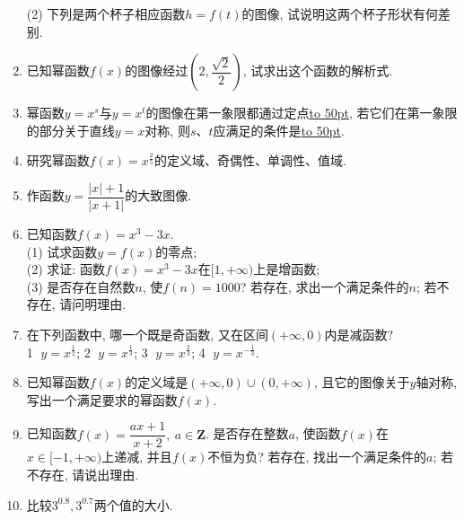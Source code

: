 \documentclass[10pt,a4paper]{article}
\newcommand{\blank}[1]{\underline{\hbox to #1pt{}}}
\begin{document}
\begin{enumerate}[1.]
\begin{center}
\end{center}
(2) 下列是两个杯子相应函数$h=f(t)$的图像, 试说明这两个杯子形状有何差别.
\begin{center}
\end{center}
\item 已知幂函数$f(x)$的图像经过$(2,\dfrac{\sqrt 2}2)$, 试求出这个函数的解析式.
\item 幂函数$y=x^s$与$y=x^t$的图像在第一象限都通过定点\blank{50}, 若它们在第一象限的部分关于直线$y=x$对称, 则$s$、$t$应满足的条件是\blank{50}.
\item 研究幂函数$f(x)=x^{\frac 25}$的定义域、奇偶性、单调性、值域.
\item 作函数$y=\dfrac{|x|+1}{|x+1|}$的大致图像.
\item 已知函数$f(x)=x^3-3x$.\\
(1) 试求函数$y=f(x)$的零点;\\
(2) 求证: 函数$f(x)=x^3-3x$在$[1,+\infty)$上是增函数;\\
(3) 是否存在自然数$n$, 使$f(n)=1000$? 若存在, 求出一个满足条件的$n$; 若不存在, 请问明理由.
\item 在下列函数中, 哪一个既是奇函数, 又在区间$(+\infty ,0)$内是减函数?\\ 
\textcircled{1} $y=x^{\frac 12}$; \textcircled{2} $y=x^{\frac 13}$; \textcircled{3} $y=x^{\frac 23}$; \textcircled{4} $y=x^{-\frac 13}$.
\item 已知幂函数$f(x)$的定义域是$(+\infty ,0)\cup (0,+\infty)$, 且它的图像关于$y$轴对称, 写出一个满足要求的幂函数$f(x)$.
\item 已知函数$f(x)=\dfrac{ax+1}{x+2},\ a\in \mathbf{Z}$. 是否存在整数$a$, 使函数$f(x)$在$x\in [-1,+\infty)$上递减, 并且$f(x)$不恒为负? 若存在, 找出一个满足条件的$a$; 若不存在, 请说出理由.
\item 比较$3^{0.8},3^{0.7}$两个值的大小.

\end{enumerate}
\end{document}
